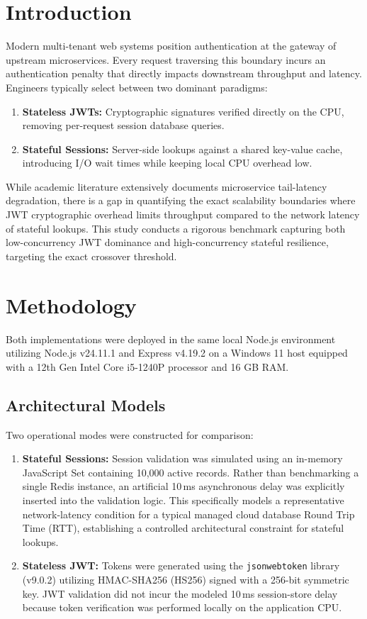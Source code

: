 \documentclass[conference]{IEEEtran}
\begin{document}
\section{Introduction}
Modern multi-tenant web systems position authentication at the gateway of upstream microservices. Every request traversing this boundary incurs an authentication penalty that directly impacts downstream throughput and latency. Engineers typically select between two dominant paradigms:
\begin{enumerate}
    \item \textbf{Stateless JWTs:} Cryptographic signatures verified directly on the CPU, removing per-request session database queries.
    \item \textbf{Stateful Sessions:} Server-side lookups against a shared key-value cache, introducing I/O wait times while keeping local CPU overhead low.
\end{enumerate}

While academic literature extensively documents microservice tail-latency degradation, there is a gap in quantifying the exact scalability boundaries where JWT cryptographic overhead limits throughput compared to the network latency of stateful lookups. This study conducts a rigorous benchmark capturing both low-concurrency JWT dominance and high-concurrency stateful resilience, targeting the exact crossover threshold.

\section{Methodology}
Both implementations were deployed in the same local Node.js environment utilizing Node.js v24.11.1 and Express v4.19.2 on a Windows 11 host equipped with a 12th Gen Intel Core i5-1240P processor and 16 GB RAM.

\subsection{Architectural Models}
Two operational modes were constructed for comparison:
\begin{enumerate}
    \item \textbf{Stateful Sessions:} Session validation was simulated using an in-memory JavaScript Set containing 10,000 active records. Rather than benchmarking a single Redis instance, an artificial 10\,ms asynchronous delay was explicitly inserted into the validation logic. This specifically models a representative network-latency condition for a typical managed cloud database Round Trip Time (RTT), establishing a controlled architectural constraint for stateful lookups.
    \item \textbf{Stateless JWT:} Tokens were generated using the \texttt{jsonwebtoken} library (v9.0.2) utilizing HMAC-SHA256 (HS256) signed with a 256-bit symmetric key. JWT validation did not incur the modeled 10\,ms session-store delay because token verification was performed locally on the application CPU.
\end{enumerate}
\end{document}
